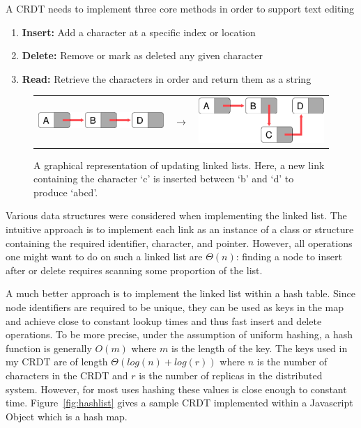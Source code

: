 \documentclass[12pt,a4paper,twoside,openright]{report}
\begin{document}
		A CRDT needs to implement three core methods in order to support text editing
		\begin{enumerate}
			\item \textbf{Insert:} Add a character at a specific index or location
			\item \textbf{Delete:} Remove or mark as deleted any given character
			\item \textbf{Read:} Retrieve the characters in order and return them as a string
		\end{enumerate} 
		
		
		\begin{figure}[htb]
		\centering
		  \begin{tabular}{ >{\centering}m{6cm} >{\centering}m{15mm} >{\centering\arraybackslash}m{6cm} }
		    \includegraphics[width=1\linewidth]{figs/linkedlist_0.eps}  &
		    $\longrightarrow$  &
		    \includegraphics[width=1\linewidth]{figs/linkedlist.eps}
		  \end{tabular}
		\caption[Updating linked lists]{A graphical representation of updating linked lists. Here, a new link containing the character `c' is inserted between `b' and `d' to produce `abcd'.}
		\label{fig:linkedlist}
		\end{figure}
		
		Various data structures were considered when implementing the linked list. The intuitive approach is to implement each link as an instance of a class or structure containing the required identifier, character, and pointer. However, all operations one might want to do on such a linked list are $\Theta (n)$: finding a node to insert after or delete requires scanning some proportion of the list.
		
		A much better approach is to implement the linked list within a hash table. Since node identifiers are required to be unique, they can be used as keys in the map and achieve close to constant lookup times and thus fast insert and delete operations. To be more precise, under the assumption of uniform hashing, a hash function is generally $O(m)$ where $m$ is the length of the key. The keys used in my CRDT are of length $\Theta (log(n)+log(r))$ where $n$ is the number of characters in the CRDT and $r$ is the number of replicas in the distributed system. However, for most uses hashing these values is close enough to constant time. Figure~\ref{fig:hashlist} gives a sample CRDT implemented within a Javascript Object which is a hash map.
		
\end{document}
